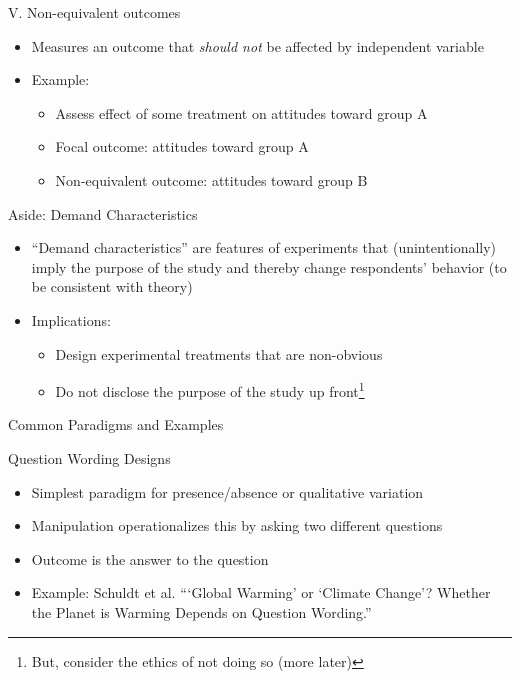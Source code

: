 \documentclass[
  ignorenonframetext,
]{beamer}
\begin{document}
\begin{frame}{V. Non-equivalent outcomes}
\protect\hypertarget{v.-non-equivalent-outcomes}{}
\small

\begin{itemize}\itemsep0.5em
\item Measures an outcome that \textit{should not} be affected by independent variable
\item<2-> Example:
    \begin{itemize}
    \item Assess effect of some treatment on attitudes toward group A
    \item Focal outcome: attitudes toward group A
    \item Non-equivalent outcome: attitudes toward group B
    \end{itemize}
\end{itemize}
\end{frame}

\begin{frame}{Aside: Demand Characteristics}
\protect\hypertarget{aside-demand-characteristics}{}
\small

\begin{itemize}\itemsep1em
\item ``Demand characteristics'' are features of experiments that (unintentionally) imply the purpose of the study and thereby change respondents' behavior (to be consistent with theory)
\item Implications:
    \begin{itemize}\footnotesize
    \item Design experimental treatments that are non-obvious
    \item Do not disclose the purpose of the study up front\footnote{But, consider the ethics of not doing so (more later)}
    \end{itemize}
\end{itemize}
\end{frame}

\begin{frame}{Common Paradigms and Examples}
\protect\hypertarget{common-paradigms-and-examples}{}
\end{frame}

\begin{frame}{Question Wording Designs}
\protect\hypertarget{question-wording-designs}{}
\begin{itemize}\itemsep1em
\item Simplest paradigm for presence/absence or qualitative variation
\item Manipulation operationalizes this by asking two different questions
\item Outcome is the answer to the question
\item Example: Schuldt et al. ```Global Warming' or `Climate Change'? Whether the Planet is Warming Depends on Question Wording.''
\end{itemize}
\end{frame}
\end{document}

